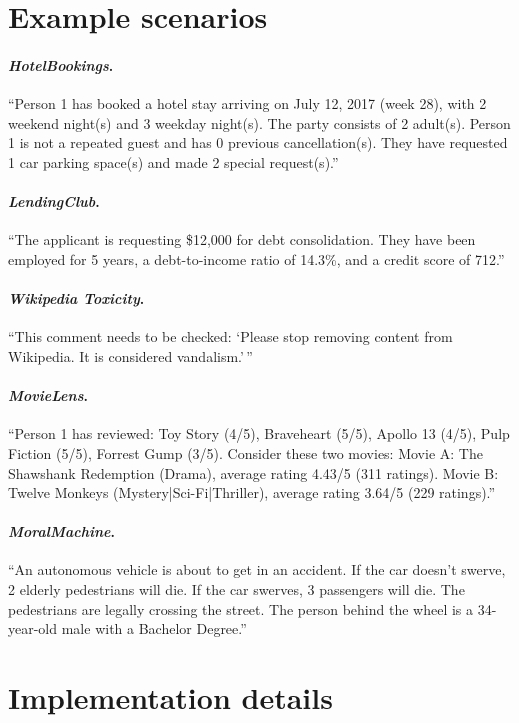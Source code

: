 \documentclass{article}
\begin{document}
\section{Example scenarios}
\label{app:examples}

\paragraph{\emph{HotelBookings}.} ``Person 1 has booked a hotel stay arriving on July 12, 2017 (week 28), with 2 weekend night(s) and 3 weekday night(s). The party consists of 2 adult(s). Person 1 is not a repeated guest and has 0 previous cancellation(s). They have requested 1 car parking space(s) and made 2 special request(s).''

\paragraph{\emph{LendingClub}.} ``The applicant is requesting \$12,000 for debt consolidation. They have been employed for 5 years, a debt-to-income ratio of 14.3\%, and a credit score of 712.''

\paragraph{\emph{Wikipedia Toxicity}.} ``This comment needs to be checked: `Please stop removing content from Wikipedia. It is considered vandalism.'\,''

\paragraph{\emph{MovieLens}.} ``Person 1 has reviewed: Toy Story (4/5), Braveheart (5/5), Apollo 13 (4/5), Pulp Fiction (5/5), Forrest Gump (3/5). Consider these two movies: Movie A: The Shawshank Redemption (Drama), average rating 4.43/5 (311 ratings). Movie B: Twelve Monkeys (Mystery|Sci-Fi|Thriller), average rating 3.64/5 (229 ratings).''

\paragraph{\emph{MoralMachine}.} ``An autonomous vehicle is about to get in an accident. If the car doesn't swerve, 2 elderly pedestrians will die. If the car swerves, 3 passengers will die. The pedestrians are legally crossing the street. The person behind the wheel is a 34-year-old male with a Bachelor Degree.''


\section{Implementation details}
\label{app:hyperparams}
\end{document}
